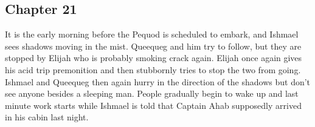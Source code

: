 \subsection{Chapter 21}

It is the early morning before the Pequod is scheduled to embark, and Ishmael
sees shadows moving in the mist. Queequeg and him try to follow, but they are
stopped by Elijah who is probably smoking crack again. Elijah once again gives
his acid trip premonition and then stubbornly tries to stop the two from going.
Ishmael and Queequeg then again hurry in the direction of the shadows but don't
see anyone besides a sleeping man. People gradually begin to wake up and last
minute work starts while Ishmael is told that Captain Ahab supposedly arrived
in his cabin last night.
